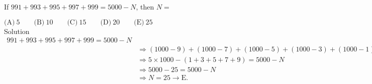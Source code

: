 

If $991+993+995+997+999=5000-N$, then $N=$

$\text{(A)}\ 5 \qquad \text{(B)}\ 10 \qquad \text{(C)}\ 15 \qquad \text{(D)}\ 20 \qquad \text{(E)}\ 25$
\\
Solution
\\
\begin{align*} 991+993+995+997+999=5000-N \\ &\Rightarrow (1000-9)+(1000-7)+(1000-5)+(1000-3)+(1000-1) = 5000-N \\ &\Rightarrow 5\times 1000-(1+3+5+7+9) = 5000 -N \\ &\Rightarrow 5000-25=5000-N \\ &\Rightarrow N=25\rightarrow \boxed{\text{E}}.  \end{align*}
